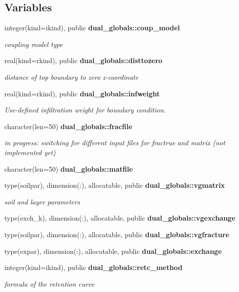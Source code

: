 \subsection*{Variables}
\begin{DoxyCompactItemize}
\item 
integer(kind=ikind), public {\bf dual\+\_\+globals\+::coup\+\_\+model}
\begin{DoxyCompactList}\small\item\em coupling model type \end{DoxyCompactList}\item 
real(kind=rkind), public {\bf dual\+\_\+globals\+::disttozero}
\begin{DoxyCompactList}\small\item\em distance of top boundary to zero z-\/coordinate \end{DoxyCompactList}\item 
real(kind=rkind), public {\bf dual\+\_\+globals\+::infweight}
\begin{DoxyCompactList}\small\item\em Use-\/defined infiltration weight for boundary condition. \end{DoxyCompactList}\item 
character(len=50) {\bf dual\+\_\+globals\+::fracfile}
\begin{DoxyCompactList}\small\item\em in progress\+: switching for different input files for fractrue and matrix (not implemented yet) \end{DoxyCompactList}\item 
character(len=50) {\bf dual\+\_\+globals\+::matfile}
\item 
type(soilpar), dimension(\+:), allocatable, public {\bf dual\+\_\+globals\+::vgmatrix}
\begin{DoxyCompactList}\small\item\em soil and layer parameters \end{DoxyCompactList}\item 
type(exch\+\_\+k), dimension(\+:), allocatable, public {\bf dual\+\_\+globals\+::vgexchange}
\item 
type(soilpar), dimension(\+:), allocatable, public {\bf dual\+\_\+globals\+::vgfracture}
\item 
type(expar), dimension(\+:), allocatable, public {\bf dual\+\_\+globals\+::exchange}
\item 
integer(kind=ikind), public {\bf dual\+\_\+globals\+::retc\+\_\+method}
\begin{DoxyCompactList}\small\item\em formula of the retention curve \end{DoxyCompactList}\end{DoxyCompactItemize}
